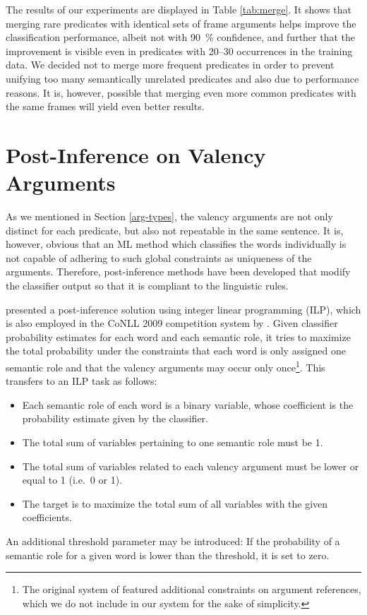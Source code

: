 \documentclass[12pt,notitlepage,a4paper]{report}
\begin{document}
The results of our experiments are displayed in Table \ref{tab:merge}. It shows that merging rare predicates with identical sets of frame arguments helps improve the classification performance, albeit not with 90~\% confidence, and further that the improvement is visible even in predicates with 20--30 occurrences in the training data. We decided not to merge more frequent predicates in order to prevent unifying too many semantically unrelated predicates and also due to performance reasons. It is, however, possible that merging even more common predicates with the same frames will yield even better results.

\section{Post-Inference on Valency Arguments}\label{post-inference}

As we mentioned in Section \ref{arg-types}, the valency arguments are not only distinct for each predicate, but also not repeatable in the same sentence. It is, however, obvious that an ML method which classifies the words individually is not capable of adhering to such global constraints as uniqueness of the arguments. Therefore, post-inference methods have been developed that modify the classifier output so that it is compliant to the linguistic rules.

\citet{punyakanok04} presented a post-inference solution using integer linear programming (ILP), which is also employed in the CoNLL 2009 competition system by \citet{che09}. Given classifier probability estimates for each word and each semantic role, it tries to maximize the total probability under the constraints that each word is only assigned one semantic role and that the valency arguments may occur only once\footnote{The original system of \citet{punyakanok04} featured additional constraints on argument references, which we do not include in our system for the sake of simplicity.}. This transfers to an ILP task as follows:
\begin{itemize}
    \item Each semantic role of each word is a binary variable, whose coefficient is the probability estimate given by the classifier.
    \item The total sum of variables pertaining to one semantic role must be 1.
    \item The total sum of variables related to each valency argument must be lower or equal to 1 (i.e.\ 0 or 1).
    \item The target is to maximize the total sum of all variables with the given coefficients.
\end{itemize}
An additional threshold parameter may be introduced: If the probability of a semantic role for a given word is lower than the threshold, it is set to zero.
\end{document}
